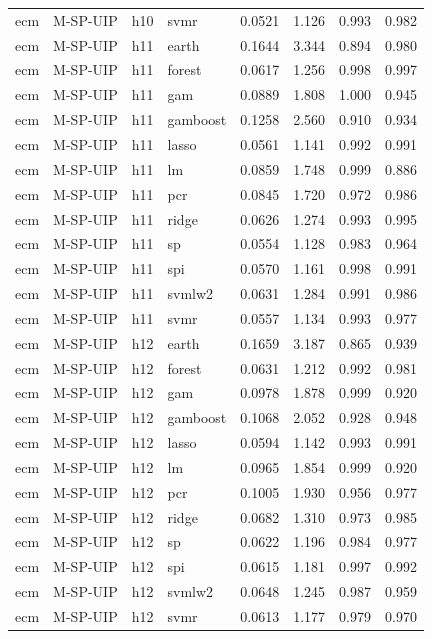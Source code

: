 \begin{ThreePartTable}
\begin{longtable}[t]{llclcccc}
ecm & M-SP-UIP & h10 & svmr & 0.0521 & 1.126 & 0.993 & 0.982\\
\addlinespace
ecm & M-SP-UIP & h11 & earth & 0.1644 & 3.344 & 0.894 & 0.980\\
ecm & M-SP-UIP & h11 & forest & 0.0617 & 1.256 & 0.998 & 0.997\\
ecm & M-SP-UIP & h11 & gam & 0.0889 & 1.808 & 1.000 & 0.945\\
ecm & M-SP-UIP & h11 & gamboost & 0.1258 & 2.560 & 0.910 & 0.934\\
ecm & M-SP-UIP & h11 & lasso & 0.0561 & 1.141 & 0.992 & 0.991\\
ecm & M-SP-UIP & h11 & lm & 0.0859 & 1.748 & 0.999 & 0.886\\
ecm & M-SP-UIP & h11 & pcr & 0.0845 & 1.720 & 0.972 & 0.986\\
ecm & M-SP-UIP & h11 & ridge & 0.0626 & 1.274 & 0.993 & 0.995\\
ecm & M-SP-UIP & h11 & sp & 0.0554 & 1.128 & 0.983 & 0.964\\
ecm & M-SP-UIP & h11 & spi & 0.0570 & 1.161 & 0.998 & 0.991\\
ecm & M-SP-UIP & h11 & svmlw2 & 0.0631 & 1.284 & 0.991 & 0.986\\
ecm & M-SP-UIP & h11 & svmr & 0.0557 & 1.134 & 0.993 & 0.977\\
\addlinespace
ecm & M-SP-UIP & h12 & earth & 0.1659 & 3.187 & 0.865 & 0.939\\
ecm & M-SP-UIP & h12 & forest & 0.0631 & 1.212 & 0.992 & 0.981\\
ecm & M-SP-UIP & h12 & gam & 0.0978 & 1.878 & 0.999 & 0.920\\
ecm & M-SP-UIP & h12 & gamboost & 0.1068 & 2.052 & 0.928 & 0.948\\
ecm & M-SP-UIP & h12 & lasso & 0.0594 & 1.142 & 0.993 & 0.991\\
ecm & M-SP-UIP & h12 & lm & 0.0965 & 1.854 & 0.999 & 0.920\\
ecm & M-SP-UIP & h12 & pcr & 0.1005 & 1.930 & 0.956 & 0.977\\
ecm & M-SP-UIP & h12 & ridge & 0.0682 & 1.310 & 0.973 & 0.985\\
ecm & M-SP-UIP & h12 & sp & 0.0622 & 1.196 & 0.984 & 0.977\\
ecm & M-SP-UIP & h12 & spi & 0.0615 & 1.181 & 0.997 & 0.992\\
ecm & M-SP-UIP & h12 & svmlw2 & 0.0648 & 1.245 & 0.987 & 0.959\\
ecm & M-SP-UIP & h12 & svmr & 0.0613 & 1.177 & 0.979 & 0.970\\

\end{longtable}
\end{ThreePartTable}
